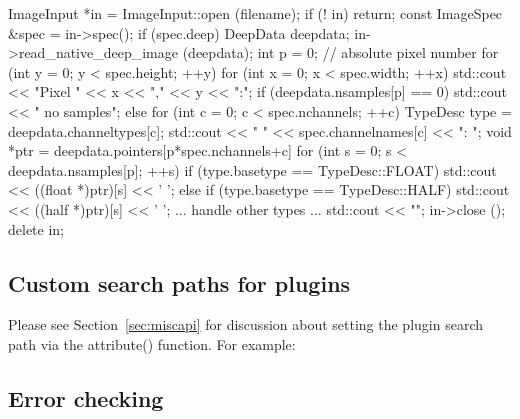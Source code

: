\begin{code}
    ImageInput *in = ImageInput::open (filename);
    if (! in)
        return;
    const ImageSpec &spec = in->spec();
    if (spec.deep) {
        DeepData deepdata;
        in->read_native_deep_image (deepdata);
        int p = 0;  // absolute pixel number
        for (int y = 0; y < spec.height;  ++y) {
            for (int x = 0;  x < spec.width;  ++x) {
                std::cout << "Pixel " << x << "," << y << ":\n";
                if (deepdata.nsamples[p] == 0)
                    std::cout << "  no samples\n";
                else
                    for (int c = 0;  c < spec.nchannels;  ++c) {
                        TypeDesc type = deepdata.channeltypes[c];
                        std::cout << "  " << spec.channelnames[c] << ": ";
                        void *ptr = deepdata.pointers[p*spec.nchannels+c]
                        for (int s = 0;  s < deepdata.nsamples[p];  ++s) {
                            if (type.basetype == TypeDesc::FLOAT)
                                std::cout << ((float *)ptr)[s] << ' ';
                            else if (type.basetype == TypeDesc::HALF)
                                std::cout << ((half *)ptr)[s] << ' ';
                            ... handle other types ...
                        }
                        std::cout << "\n";
                    }
            }
        }
    }
    in->close ();
    delete in;
\end{code}


\subsection{Custom search paths for plugins}
\label{sec:imageinput:searchpaths}

Please see Section~\ref{sec:miscapi} for discussion
about setting the plugin search path via the {\cf attribute()} function.
For example:



\subsection{Error checking}
\label{sec:imageinput:errors}

